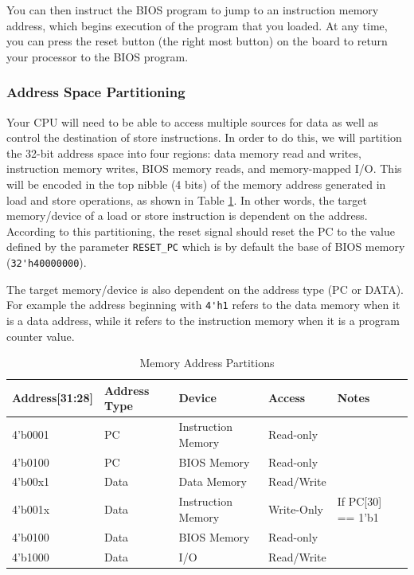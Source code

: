 You can then instruct the BIOS program to jump to an instruction memory address, which begins execution of the program that you loaded.
At any time, you can press the reset button (the right most button) on the board to return your processor to the BIOS program.

\subsubsection{Address Space Partitioning}
Your CPU will need to be able to access multiple sources for data as well as control the destination of store instructions.
In order to do this, we will partition the 32-bit address space into four regions: data memory read and writes, instruction memory writes, BIOS memory reads, and memory-mapped I/O.
This will be encoded in the top nibble (4 bits) of the memory address generated in load and store operations, as shown in Table \ref{fig:mem_space}.
In other words, the target memory/device of a load or store instruction is dependent on the address.
According to this partitioning, the reset signal should reset the PC to the value defined by the parameter \verb|RESET_PC| which is by default the base of BIOS memory (\verb|32'h40000000|).

The target memory/device is also dependent on the address type (PC or DATA).
For example the address beginning with \verb|4'h1| refers to the data memory when it is a data address, while it refers to the instruction memory when it is a program counter value.

\begin{table}[hbt]
  \begin{center}
    \caption{Memory Address Partitions}
    \label{fig:mem_space}
    \begin{tabular}{l l l l l}
      \bottomrule
      \textbf{Address[31:28]} & \textbf{Address Type} & \textbf{Device} & \textbf{Access} & \textbf{Notes} \\
      \midrule
      4'b0001 & PC   & Instruction Memory & Read-only  &\\
      4'b0100 & PC   & BIOS Memory        & Read-only  &\\
      4'b00x1 & Data & Data Memory        & Read/Write &\\
      4'b001x & Data & Instruction Memory & Write-Only & If PC[30] == 1'b1\\
      4'b0100 & Data & BIOS Memory        & Read-only  &\\
      4'b1000 & Data & I/O                & Read/Write &\\
      \bottomrule
    \end{tabular}
  \end{center}
\end{table}

